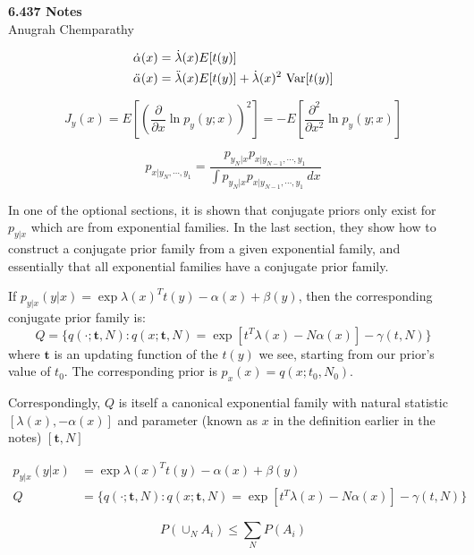 \documentclass[12pt]{article} %
\begin{document}
\setlength{\abovedisplayskip}{7pt}

\begin{center}
    \textbf{6.437 Notes}\\
    Anugrah Chemparathy
\end{center}

\begin{align*}
    \dot{\alpha}(x) 
    &= \dot{\lambda}(x) E[t(y)] \\
    \Ddot{\alpha}(x)
    &= \Ddot{\lambda}(x) E[t(y)] + \dot{\lambda}(x)^2\ \text{Var}[t(y)]
\end{align*}

\begin{equation*}
    J_y(x) =
    E\left[\left(\frac{\partial}{\partial x} \ln p_y(y;x) \right) ^2 \right]
    =- E\left[\frac{\partial^2}{\partial x^2} \ln p_y(y;x) \right]
\end{equation*}

\begin{equation*}
    p_{x|y_N,\cdots,y_1} = 
    \frac{
    p_{y_N|x}p_{x|y_{N-1}, \cdots, y_1}
    }{
    \int p_{y_N|x} p_{x|y_{N-1}, \cdots, y_1} \ dx
    }
\end{equation*}

In one of the optional sections, it is shown that conjugate priors only exist for $p_{y|x}$ which are from exponential families. In the last section, they show how to construct a conjugate prior family from a given exponential family, and essentially that all exponential families have a conjugate prior family.

If $p_{y|x}(y|x) = \exp{\lambda(x)^T t(y) - \alpha(x) + \beta(y)}$, then the corresponding conjugate prior family is:
\begin{equation*}
    Q = \{ 
    q(\cdot; \mathbf{t},N):
    q(x; \mathbf{t},N)
    =
    \exp{[t^T \lambda(x) - N\alpha(x)] - \gamma(t,N)}
    \}
\end{equation*}
where $\mathbf{t}$ is an updating function of the $t(y)$ we see, starting from our prior's value of $t_0$. The corresponding prior is $p_x(x) = q(x;t_0,N_0)$.

Correspondingly, $Q$ is itself a canonical exponential family with natural statistic $[\lambda(x), - \alpha(x)]$ and parameter (known as $x$ in the definition earlier in the notes) $[\mathbf{t}, N]$

\begin{align*}
    p_{y|x}(y|x) &= \exp{\lambda(x)^T t(y) - \alpha(x) + \beta(y)} \\
    Q &= \{ 
    q(\cdot; \mathbf{t},N):
    q(x; \mathbf{t},N)
    =
    \exp{[t^T \lambda(x) - N\alpha(x)] - \gamma(t,N)}
    \}
\end{align*}

\begin{equation*}
    P(\cup_N A_i) \leq \sum_N P(A_i)
\end{equation*}
\end{document}
